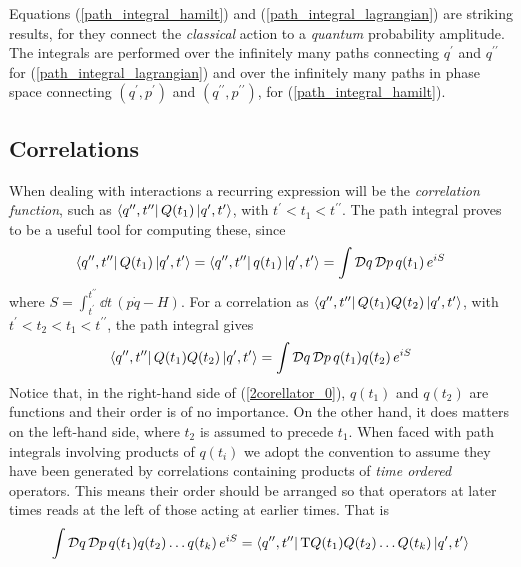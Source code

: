 Equations (\ref{path_integral_hamilt}) and (\ref{path_integral_lagrangian}) are striking results, for they connect the \textit{classical} action to a \textit{quantum} probability amplitude. The integrals are performed over the infinitely many paths connecting $q^{\prime}$ and $q^{\prime\prime}$ for (\ref{path_integral_lagrangian}) and over the infinitely many paths in phase space connecting $(q^\prime,p^\prime)$ and $(q^{\prime\prime},p^{\prime\prime})$, for (\ref{path_integral_hamilt}).
\subsection{Correlations}
When dealing with interactions a recurring expression will be the \textit{correlation function}, such as $\bra{q^{\prime\prime},t^{\prime\prime}}Q(t_1)\ket{q^\prime,t^\prime}$, with $t^\prime<t_1<t^{\prime\prime}$. The path integral proves to be a useful tool for computing these, since
\begin{equation}
    \bra{q^{\prime\prime},t^{\prime\prime}}Q(t_1)\ket{q^\prime,t^\prime}=\bra{q^{\prime\prime},t^{\prime\prime}}q(t_1)\ket{q^\prime,t^\prime}=\int\mathcal{D}q\,\mathcal{D}p\,q(t_1)\, e^{iS}
\end{equation}
where $S=\int_{t^\prime}^{t^{\prime\prime}}\dd t\, (p\dot{q}-H)$. For a correlation as $\bra{q^{\prime\prime},t^{\prime\prime}}Q(t_1)Q(t_2)\ket{q^\prime,t^\prime}$, with $t^{\prime}<t_2<t_1<t^{\prime\prime}$, the path integral gives
\begin{equation}
    \bra{q^{\prime\prime},t^{\prime\prime}}Q(t_1)Q(t_2)\ket{q^\prime,t^\prime}=\int\mathcal{D}q\,\mathcal{D}p\,q(t_1) q(t_2)\, e^{iS}
    \label{2corellator_0}
\end{equation}
Notice that, in the right-hand side of (\ref{2corellator_0}), $q(t_1)$ and $q(t_2)$ are functions and their order is of no importance. On the other hand, it does matters on the left-hand side, where $t_2$ is assumed to precede $t_1$. When faced with path integrals involving products of $q(t_i)$ we adopt the convention to assume they have been generated by correlations containing products of \textit{time ordered} operators. This means their order  should be arranged so that operators at later times reads at the left of those acting at earlier times. That is
\begin{equation}
    \int\mathcal{D}q\,\mathcal{D}p\,q(t_1) q(t_2)\dots q(t_k)\, e^{iS}=\bra{q^{\prime\prime},t^{\prime\prime}}\text{T}Q(t_1)Q(t_2)\dots Q(t_k)\ket{q^\prime,t^\prime}
    \label{pi-corellator}
\end{equation}

